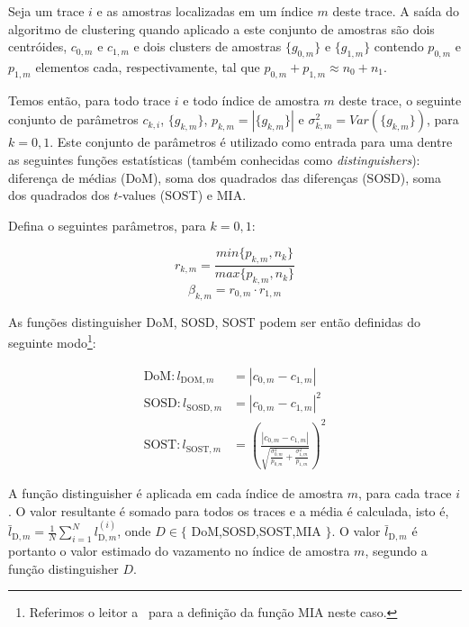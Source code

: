 Seja um trace $i$ e as amostras localizadas em um índice $m$ deste trace. A saída do algoritmo de clustering quando aplicado a este conjunto de amostras são dois centróides, $c_{0,m}$ e $c_{1,m}$ e dois clusters de amostras $\{g_{0,m}\}$ e $\{g_{1,m}\}$ contendo $p_{0,m}$ e $p_{1,m}$ elementos cada, respectivamente, tal que $p_{0,m} + p_{1,m}\approx n_0 + n_1$.

Temos então, para todo trace $i$ e todo índice de amostra $m$ deste trace, o seguinte conjunto de parâmetros $c_{k,i}$, $\{g_{k,m}\}$, $p_{k,m} = |\{g_{k,m}\}|$ e $\sigma^2_{k,m} = Var(\{g_{k,m}\})$, para $k = 0,1$. Este conjunto de parâmetros é utilizado como entrada para uma dentre as seguintes funções estatísticas (também conhecidas como \textit{distinguishers}): diferença de médias (DoM), soma dos quadrados das diferenças (SOSD), soma dos quadrados dos $t$-values (SOST) e MIA.

Defina o seguintes parâmetros, para $k=0,1$:

\begin{equation}	r_{k,m} = \frac{min\{p_{k,m}, n_k\} }{ max\{p_{k,m}, n_k\}}	\end{equation}
\begin{equation}	\beta_{k,m} = r_{0,m} \cdot r_{1,m}	\end{equation}

As funções distinguisher DoM, SOSD, SOST podem ser então definidas do seguinte modo\footnote{Referimos o leitor a~\cite{PerinChmielewski2015} para a definição da função MIA neste caso.}:

\begin{align*}
	\text{DoM}: l_{\text{DOM}, m} 	&= |c_{0,m} - c_{1,m}| \\
	\text{SOSD}: l_{\text{SOSD}, m} &= |c_{0,m} - c_{1,m}|^2 \\
	\text{SOST}: l_{\text{SOST}, m} &= \left( \frac{|c_{0,m} - c_{1,m}|} {\sqrt{ \frac{\sigma^2_{0,m}}{p_{0,m}} + \frac{\sigma^2_{1,m}}{p_{1,m}} }}   \right) ^ 2
\end{align*}

A função distinguisher é aplicada em cada índice de amostra $m$, para cada trace $i$. O valor resultante é somado para todos os traces e a média é calculada, isto é, $\bar{l}_{\text{D}, m} = \frac{1}{N}\sum_{i=1}^{N} l^{(i)}_{\text{D}, m}$, onde $D \in \{$ DoM,SOSD,SOST,MIA $\}$. O valor $\bar{l}_{\text{D}, m}$ é portanto o valor estimado do vazamento no índice de amostra $m$, segundo a função distinguisher $D$.

